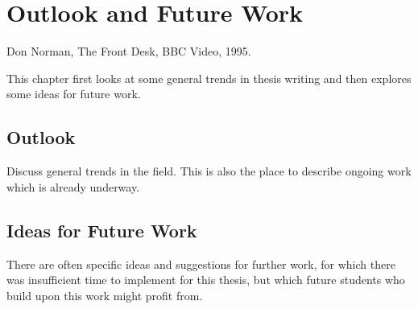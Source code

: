 %
%
% 
% 
% 

\chapter{Outlook and Future Work}

\label{chap:Outlook}


{
Don Norman, The Front Desk, BBC Video, 1995.
}



This chapter first looks at some general trends in thesis writing
and then explores some ideas for future work.



\section{Outlook}

Discuss general trends in the field. This is also the place to
describe ongoing work which is already underway.



\section{Ideas for Future Work}

There are often specific ideas and suggestions for further work, for
which there was insufficient time to implement for this thesis, but
which future students who build upon this work might profit from.




